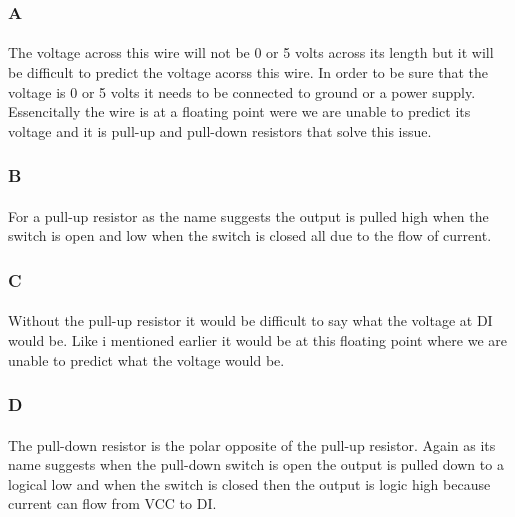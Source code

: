 \documentclass[12pt]{article}
\begin{document}
			\subsubsection{A}
				\paragraph{}
					The voltage across this wire will not be 0 or 5 volts across its length but it will be difficult to predict the voltage acorss this wire.  In order
					to be sure that the voltage is 0 or 5 volts it needs to be connected to ground or a power supply.  Essencitally the wire is at a floating point
					were we are unable to predict its voltage and it is pull-up and pull-down resistors that solve this issue.
			
			\subsubsection{B}
				\paragraph{}
					For a pull-up resistor as the name suggests the output is pulled high when the switch is open and low when the switch is closed all due to the 
					flow of current.

			\subsubsection{C}
				\paragraph{}
					Without the pull-up resistor it would be difficult to say what the voltage at DI would be.  Like i mentioned earlier it would be at this floating point
					where we are unable to predict what the voltage would be.

			\subsubsection{D}
				\paragraph{}
					The pull-down resistor is the polar opposite of the pull-up resistor.  Again as its name suggests when the pull-down switch is open the output is
					pulled down to a logical low and when the switch is closed then the output is logic high because current can flow from VCC to DI.
\end{document}
